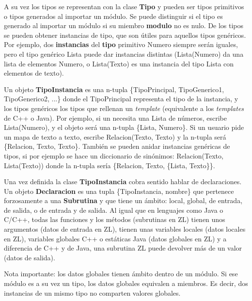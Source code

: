 \documentclass{report}
\begin{document}
	\vspace{10px}
	
	A su vez los tipos se representan con la clase \textbf{Tipo} y pueden ser tipos primitivos o tipos generados al importar un módulo. Se puede distinguir si el tipo es generado al importar un módulo si su miembro \textbf{modulo} no es nulo. De los tipos se pueden obtener instancias de tipo, que son útiles para aquellos tipos genéricos. Por ejemplo, dos \textbf{instancias} del \textbf{tipo} primitivo Numero siempre serán iguales, pero el tipo genérico Lista puede dar instancias distintas (Lista(Numero) da una lista de elementos Numero, o Lista(Texto) es una instancia del tipo Lista con elementos de texto). 
	
	\vspace{10px}
	
	Un objeto \textbf{TipoInstancia} es una n-tupla \{TipoPrincipal, TipoGenerico1, TipoGenerico2, ...\} donde el TipoPrincipal representa el tipo de la instancia, y los tipos genéricos los tipos que rellenan un \textit{template} (equivalente a los \textit{templates} de C++ o Java). Por ejemplo, si un necesita una Lista de números, escribe Lista(Numero), y el objeto será una n-tupla \{Lista, Numero\}. Si un usuario pide un mapa de texto a texto, escribe Relacion(Texto, Texto) y la n-tupla será \{Relacion, Texto, Texto\}. También se pueden anidar instancias genéricas de tipos, si por ejemplo se hace un diccionario de sinónimos: Relacion(Texto, Lista(Texto)) donde la n-tupla sería \{Relacion, Texto, \{Lista, Texto\}\}.
	
	\vspace{10px}
	
	Una vez definida la clase \textbf{TipoInstancia} cobra sentido hablar de declaraciones. Un objeto \textbf{Declaracion} es una tupla \{TipoInstancia, nombre\} que pertenece forzosamente a una \textbf{Subrutina} y que tiene un ámbito: local, global, de entrada, de salida, o de entrada y de salida. Al igual que en lenguajes como Java o C/C++, todas las funciones y los métodos (subrutinas en ZL) tienen unos argumentos (datos de entrada en ZL), tienen unas variables locales (datos locales en ZL), variables globales C++ o estáticas Java (datos globales en ZL) y a diferencia de C++ y de Java, una subrutina ZL puede devolver más de un valor (datos de salida).
	
	\vspace{10px}
	\noindent
	Nota importante: los datos globales tienen ámbito dentro de un módulo. Si ese módulo es a su vez un tipo, los datos globales equivalen a miembros. Es decir, dos instancias de un mismo tipo no comparten valores globales. 
	
\end{document}
